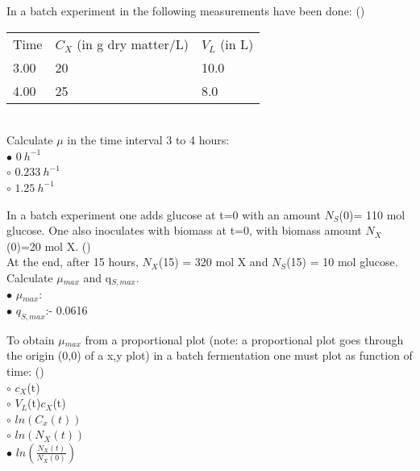 \documentclass[]{beamer}
\begin{document}
\begin{frame}[shrink] {} 
\color{blue}
  In a batch experiment in the following measurements have been done:
 ({\color{green}{Q8}})\\
\color{gray}
\begin{tabular}[ ]{l l l}
Time & $C_{X}$ (in g dry matter/L) & $V_{L}$ (in L)  \\
3.00 & 20 & 10.0  \\
4.00 & 25 & 8.0  \\
\end{tabular}  \\
\color{blue}
  Calculate $\mu$ in the time interval 3 to 4 hours:
  \\
\color{black}
\setlength{\parindent}{-0.4cm}
{\color{red}$\bullet$} $0 ~h^{-1}$  \\
{\color{red}$\circ$} $0.233 ~h^{-1}$  \\
{\color{red}$\circ$} $1.25 ~h^{-1}$  \\
\end{frame}


\begin{frame}[shrink] {} 
\color{blue}
In a batch experiment one adds glucose at t=0 with an amount $N_{S}$(0)= 110 mol glucose. One also inoculates with biomass at t=0, with biomass amount $N_{X}$(0)=20 mol X. ({\color{green}{Q9}})\\
At the end, after 15 hours, $N_{X}$(15) = 320 mol X and $N_{S}$(15) = 10 mol glucose.  \\
Calculate $\mu$$_{max}$ and q$_{S,max}$.  \\[.5em]
\color{black}
\setlength{\parindent}{-0.4cm}
{\color{red}$\bullet$} $\mu$$_{max}$:  \\
{\color{red}$\bullet$} $q_{S,max}$:\quad - 0.0616 \\
\end{frame}


\begin{frame}[shrink] {} 
\color{blue}
To obtain $\mu$$_{max}$ from a proportional plot (note: a proportional plot goes through the origin (0,0) of a x,y plot) in a batch fermentation one must plot as function of time: ({\color{green}{Q10}})\\[0.5em]
\color{black}
\setlength{\parindent}{-0.4cm}
{\color{red}$\circ$} $c_{X}$(t)  \\[0.3em]
{\color{red}$\circ$} $V_{L}$(t)$c_{X}$(t)  \\[0.3em]
{\color{red}$\circ$} $ln(C_x(t))$  \\[0.3em]
{\color{red}$\circ$} $ln(N_X(t))$  \\[0.3em]
{\color{red}$\bullet$} $ln(\frac{N_X(t)}{N_X(0)})$  \\[0.3em]
\end{frame}
\end{document}
